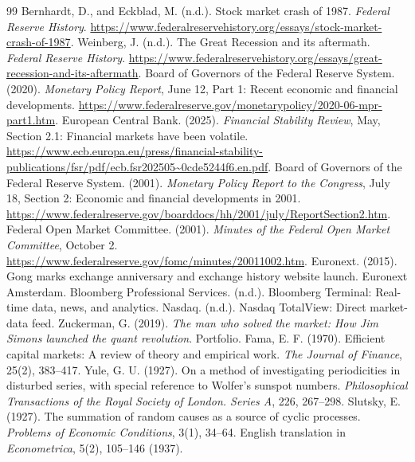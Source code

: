 \documentclass[12pt,a4paper]{article}
\numberwithin{equation}{section}
\numberwithin{table}{section}
\numberwithin{figure}{section}
\begin{document}
\clearpage
{}
\begin{thebibliography}{99}
 Bernhardt, D., and Eckblad, M. (n.d.). Stock market crash of 1987. \emph{Federal Reserve History}. \url{https://www.federalreservehistory.org/essays/stock-market-crash-of-1987}.
 Weinberg, J. (n.d.). The Great Recession and its aftermath. \emph{Federal Reserve History}. \url{https://www.federalreservehistory.org/essays/great-recession-and-its-aftermath}.
 Board of Governors of the Federal Reserve System. (2020). \emph{Monetary Policy Report}, June 12, Part 1: Recent economic and financial developments. \url{https://www.federalreserve.gov/monetarypolicy/2020-06-mpr-part1.htm}.
 European Central Bank. (2025). \emph{Financial Stability Review}, May, Section 2.1: Financial markets have been volatile. \url{https://www.ecb.europa.eu/press/financial-stability-publications/fsr/pdf/ecb.fsr202505~0cde5244f6.en.pdf}.
 Board of Governors of the Federal Reserve System. (2001). \emph{Monetary Policy Report to the Congress}, July 18, Section 2: Economic and financial developments in 2001. \url{https://www.federalreserve.gov/boarddocs/hh/2001/july/ReportSection2.htm}.
 Federal Open Market Committee. (2001). \emph{Minutes of the Federal Open Market Committee}, October 2. \url{https://www.federalreserve.gov/fomc/minutes/20011002.htm}.
 Euronext. (2015). Gong marks exchange anniversary and exchange history website launch. Euronext Amsterdam.
 Bloomberg Professional Services. (n.d.). Bloomberg Terminal: Real-time data, news, and analytics.
 Nasdaq. (n.d.). Nasdaq TotalView: Direct market-data feed.
 Zuckerman, G. (2019). \emph{The man who solved the market: How Jim Simons launched the quant revolution}. Portfolio.
 Fama, E. F. (1970). Efficient capital markets: A review of theory and empirical work. \emph{The Journal of Finance}, 25(2), 383--417.
 Yule, G. U. (1927). On a method of investigating periodicities in disturbed series, with special reference to Wolfer's sunspot numbers. \emph{Philosophical Transactions of the Royal Society of London. Series A}, 226, 267--298.
 Slutsky, E. (1927). The summation of random causes as a source of cyclic processes. \emph{Problems of Economic Conditions}, 3(1), 34--64. English translation in \emph{Econometrica}, 5(2), 105--146 (1937).

\end{thebibliography}
\end{document}
